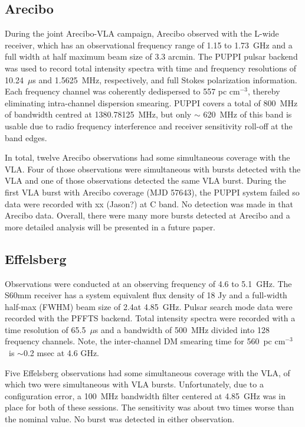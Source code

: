 \documentclass[twocolumn]{aastex61}
\begin{document}
\subsection{Arecibo}

During the joint Arecibo-VLA campaign, Arecibo observed with the L-wide receiver, which has an observational frequency range of 1.15 to 1.73~GHz and a full width at half maximum beam size of 3.3 arcmin. The PUPPI pulsar backend was used to record total intensity spectra with time and frequency resolutions of 10.24~$\mu$s and 1.5625~MHz, respectively, and full Stokes polarization information. Each frequency channel was coherently dedispersed to 557 pc cm$^{-3}$, thereby eliminating intra-channel dispersion smearing. PUPPI covers a total of 800~MHz of bandwidth centred at 1380.78125~MHz, but only $\sim$ 620~MHz of this band is usable due to radio frequency interference and receiver sensitivity roll-off at the band edges.

In total, twelve Arecibo observations had some simultaneous coverage with the VLA. Four of those observations were simultaneous with bursts detected with the VLA and one of those observations detected the same VLA burst. During the first VLA burst with Arecibo coverage (MJD 57643), the PUPPI system failed so data were recorded with {\color{red} xx (Jason?)} at C band. No detection was made in that Arecibo data. Overall, there were many more bursts detected at Arecibo and a more detailed analysis will be presented in a future paper.

\subsection{Effelsberg}

Observations were conducted at an observing frequency of 4.6 to 5.1~GHz. The S60mm receiver has a system equivalent flux density of 18 Jy and a full-width half-max (FWHM) beam size of 2.4\arcmin at 4.85~GHz. Pulsar search mode data were recorded with the PFFTS backend. Total intensity spectra were recorded with a time resolution of 65.5~$\mu$s and a bandwidth of 500~MHz divided into 128 frequency channels. Note, the inter-channel DM smearing time for 560~pc cm$^{-3}$\ is $\sim$0.2 msec at 4.6 GHz.

Five Effelsberg observations had some simultaneous coverage with the VLA, of which two were simultaneous with VLA bursts. Unfortunately, due to a configuration error, a 100~MHz bandwidth filter centered at 4.85~GHz was in place for both of these sessions. The sensitivity was about two times worse than the nominal value. No burst was detected in either observation.
\end{document}
